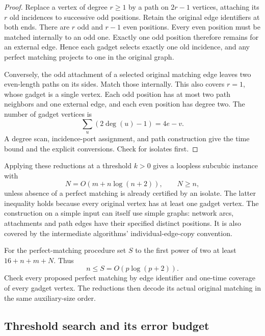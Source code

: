 \begin{proof}
Replace a vertex of degree $r\ge1$ by a path on $2r-1$ vertices, attaching
its $r$ old incidences to successive odd positions. Retain the original
edge identifiers at both ends. There are $r$ odd and $r-1$ even positions.
Every even position must be matched internally to an odd one. Exactly one
odd position therefore remains for an external edge. Hence each gadget
selects exactly one old incidence, and any perfect matching projects to
one in the original graph.

Conversely, the odd attachment of a selected original matching edge leaves
two even-length paths on its sides. Match those internally. This also
covers $r=1$, whose gadget is a single vertex. Each odd position has at
most two path neighbors and one external edge, and each even position
has degree two. The number of gadget vertices is
\[
                    \sum_u(2\deg(u)-1)=4e-v.
\]
A degree scan, incidence-port assignment, and path construction give the
time bound and the explicit conversions. Check for isolates first.
\end{proof}

Applying these reductions at a threshold $k>0$ gives a loopless subcubic
instance with
\begin{equation}\label{uniform:reduced-size}
                 N=O(m+n\log(n+2)),\qquad N\ge n,
\end{equation}
unless absence of a perfect matching is already certified by an isolate.
The latter inequality holds because every original vertex has at least
one gadget vertex. The construction on a simple input can itself use
simple graphs: network arcs, attachments and path edges have their
specified distinct positions. It is also covered by the intermediate
algorithms' individual-edge-copy convention.

For the perfect-matching procedure set $S$ to the first power of two at
least $16+n+m+N$. Thus
\begin{equation}\label{uniform:master}
               n\le S=O(p\log(p+2)).
\end{equation}
Check every proposed perfect matching by edge identifier and one-time
coverage of every gadget vertex. The reductions then decode its actual
original matching in the same auxiliary-size order.

\subsection{Threshold search and its error budget}

